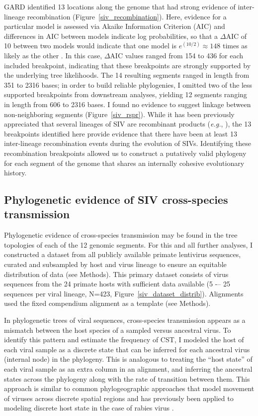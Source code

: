 GARD identified 13 locations along the genome that had strong evidence of inter-lineage recombination (Figure~\ref{siv_recombination}).
Here, evidence for a particular model is assessed via Akaike Information Criterion (AIC) and differences in AIC between models indicate log probabilities, so that a $\Delta$AIC of 10 between two models would indicate that one model is $e^{(10/2)} \approx 148$ times as likely as the other \citep{akaike1992information}.
In this case, $\Delta$AIC values ranged from 154 to 436 for each included breakpoint, indicating that these breakpoints are strongly supported by the underlying tree likelihoods.
The 14 resulting segments ranged in length from 351 to 2316 bases; in order to build reliable phylogenies, I omitted two of the less supported breakpoints from downstream analyses, yielding 12 segments ranging in length from 606 to 2316 bases.
I found no evidence to suggest linkage between non-neighboring segments (Figure~\ref{siv_rspr}).
While it has been previously appreciated that several lineages of SIV are recombinant products (\textit{e.g.}, \citep{bailes2003hybrid,jin1994mosaic}), the 13 breakpoints identified here provide evidence that there have been at least 13 inter-lineage recombination events during the evolution of SIVs.
Identifying these recombination breakpoints allowed us to construct a putatively valid phylogeny for each segment of the genome that shares an internally cohesive evolutionary history.

\subsection{Phylogenetic evidence of SIV cross-species transmission}
Phylogenetic evidence of cross-species transmission may be found in the tree topologies of each of the 12 genomic segments.
For this and all further analyses, I constructed a dataset from all publicly available primate lentivirus sequences, curated and subsampled by host and virus lineage to ensure an equitable distribution of data (see Methods).
This primary dataset consists of virus sequences from the 24 primate hosts with sufficient data available (5 -– 25 sequences per viral lineage, N=423, Figure~\ref{siv_dataset_distrib}).
Alignments used the fixed compendium alignment as a template (see Methods).

In phylogenetic trees of viral sequences, cross-species transmission appears as a mismatch between the host species of a sampled versus ancestral virus.
To identify this pattern and estimate the frequency of CST, I modeled the host of each viral sample as a discrete state that can be inferred for each ancestral virus (internal node) in the phylogeny.
This is analogous to treating the “host state” of each viral sample as an extra column in an alignment, and inferring the ancestral states across the phylogeny along with the rate of transition between them.
This approach is similar to common phylogeographic approaches that model movement of viruses across discrete spatial regions \citep{volz2013viral} and has previously been applied to modeling discrete host state in the case of rabies virus \citep{faria2013simultaneously}.

